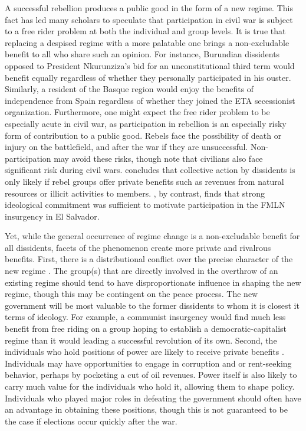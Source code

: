 A successful rebellion produces a public good in the form of a new regime. This fact has led many scholars to speculate that participation in civil war is subject to a free rider problem at both the individual \citep{Lichbach1995,Wood2003,Bramoulle2007} and group \citep{Metternich2013} levels. It is true that replacing a despised regime with a more palatable one brings a non-excludable benefit to all who share such an opinion. For instance, Burundian dissidents opposed to President Nkurunziza's bid for an unconstitutional third term would benefit equally regardless of whether they personally participated in his ouster. Similarly, a resident of the Basque region would enjoy the benefits of independence from Spain regardless of whether they joined the ETA secessionist organization. Furthermore, one might expect the free rider problem to be especially acute in civil war, as participation in rebellion is an especially risky form of contribution to a public good. Rebels face the possibility of death or injury on the battlefield, and after the war if they are unsuccessful. Non-participation may avoid these risks, though \citet{Kalyvas2014} note that civilians also face significant risk during civil wars. \citet{Lichbach1995} concludes that collective action by dissidents is only likely if rebel groups offer private benefits such as revenues from natural resources or illicit activities to members. \citet{Wood2003}, by contrast, finds that strong ideological commitment was sufficient to motivate participation in the FMLN insurgency in El Salvador.

Yet, while the general occurrence of regime change is a non-excludable benefit for all dissidents, facets of the phenomenon create more private and rivalrous benefits. First, there is a distributional conflict over the precise character of the new regime \citep{Metternich2013}. The group(s) that are directly involved in the overthrow of an existing regime should tend to have disproportionate influence in shaping the new regime, though this may be contingent on the peace process. The new government will be most valuable to the former dissidents to whom it is closest it terms of ideology. For example, a communist insurgency would find much less benefit from free riding on a group hoping to establish a democratic-capitalist regime than it would leading a successful revolution of its own. Second, the individuals who hold positions of power are likely to receive private benefits \citep{Christia2012,Wolford}. Individuals may have opportunities to engage in corruption and or rent-seeking behavior, perhaps by pocketing a cut of oil revenues. Power itself is also likely to carry much value for the individuals who hold it, allowing them to shape policy. Individuals who played major roles in defeating the government should often have an advantage in obtaining these positions, though this is not guaranteed to be the case if elections occur quickly after the war.

